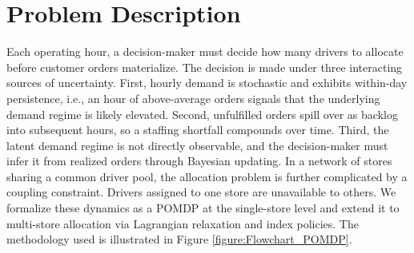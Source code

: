 \documentclass[preprint,11pt,authoryear]{elsarticle}
\theoremstyle{remark}
\begin{document}

\section{Problem Description}
\label{sec:problem}


Each operating hour, a decision-maker must decide how many drivers to allocate before customer orders materialize. The decision is made under three interacting sources of uncertainty. First, hourly demand is stochastic and exhibits within-day persistence, i.e., an hour of above-average orders signals that the underlying demand regime is likely elevated. Second, unfulfilled orders spill over as backlog into subsequent hours, so a staffing shortfall compounds over time. Third, the latent demand regime is not directly observable, and the decision-maker must infer it from realized orders through Bayesian updating. In a network of stores sharing a common driver pool, the allocation problem is further complicated by a coupling constraint. Drivers assigned to one store are unavailable to others. We formalize these dynamics as a POMDP at the single-store level and extend it to multi-store allocation via Lagrangian relaxation and index policies. The methodology used is illustrated in Figure \ref{figure:Flowchart_POMDP}.

\end{document}
